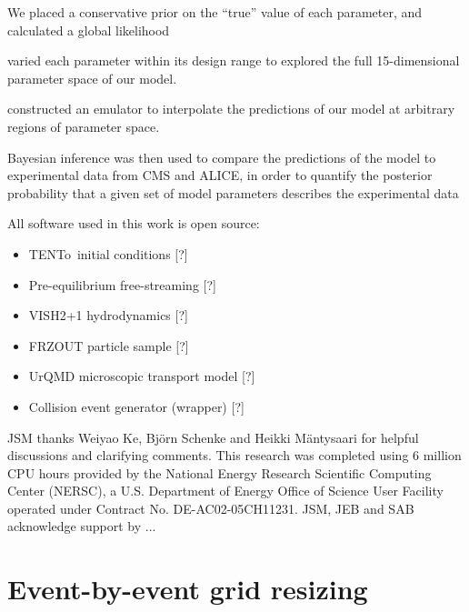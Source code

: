 \documentclass[aps,prc,reprint,amsmath,nofootinbib]{revtex4-1}
\newcommand{\trento}{T\raisebox{-0.5ex}{R}ENTo}
\newcommand{\note}{\textcolor{theblue}{[?]}}
\begin{document}
We placed a conservative prior on the ``true'' value of each parameter, and calculated a global likelihood

varied each parameter within its design range to explored the full 15-dimensional parameter space of our model.

constructed an emulator to interpolate the predictions of our model at arbitrary regions of parameter space.

Bayesian inference was then used to compare the predictions of the model to experimental data from CMS and ALICE, in order to quantify the posterior probability that a given set of model parameters describes the experimental data

\medskip

All software used in this work is open source:
\begin{itemize}[leftmargin=2\parindent, itemsep=0pt, topsep=5pt]
  \item \trento\ initial conditions \note
  \item Pre-equilibrium free-streaming \note
  \item VISH2+1 hydrodynamics \note
  \item FRZOUT particle sample \note
  \item UrQMD microscopic transport model \note
  \item Collision event generator (wrapper) \note
\end{itemize}

\begin{acknowledgments}
  JSM thanks Weiyao Ke, Bj\"orn Schenke and Heikki M\"antysaari for helpful discussions and clarifying comments.
  This research was completed using 6 million CPU hours provided by the National Energy Research Scientific Computing Center (NERSC), a U.S. Department of Energy Office of Science User Facility operated under Contract No. DE-AC02-05CH11231.
  JSM, JEB and SAB acknowledge support by ...
\end{acknowledgments}


\appendix

\section{Event-by-event grid resizing}
\label{app:adaptive_grid}
\end{document}
